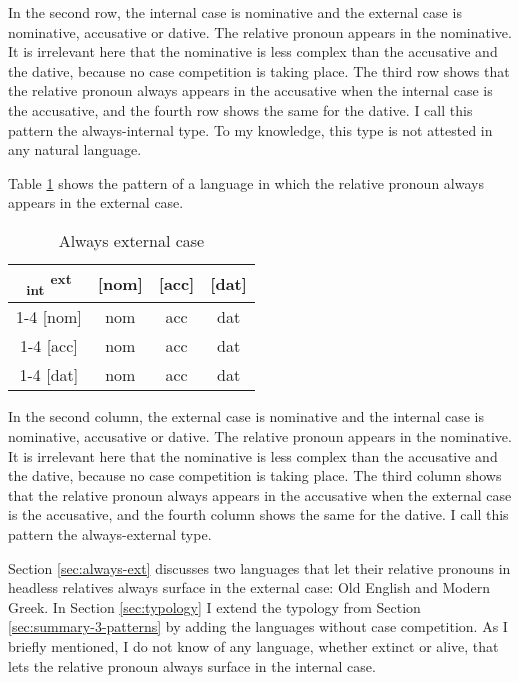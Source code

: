 In the second row, the internal case is nominative and the external case is nominative, accusative or dative. The relative pronoun appears in the nominative. It is irrelevant here that the nominative is less complex than the accusative and the dative, because no case competition is taking place. The third row shows that the relative pronoun always appears in the accusative when the internal case is the accusative, and the fourth row shows the same for the dative. I call this pattern the always-internal type. To my knowledge, this type is not attested in any natural language.

Table \ref{tbl:no-case-competition-ext} shows the pattern of a language in which the relative pronoun always appears in the external case.

\begin{table}[ht]
  \center
  \caption{Always external case}
  \begin{tabular}{c|c|c|c}
    \toprule
   \textsubscript{\ac{int}} \textsuperscript{\ac{ext}}
          & [\ac{nom}]
          & [\ac{acc}]
          & [\ac{dat}]
          \\ \cmidrule{1-4}
      [\ac{nom}]
          & \ac{nom}
          & \ac{acc}
          & \ac{dat}
          \\ \cmidrule{1-4}
      [\ac{acc}]
          & \ac{nom}
          & \ac{acc}
          & \ac{dat}
          \\ \cmidrule{1-4}
      [\ac{dat}]
          & \ac{nom}
          & \ac{acc}
          & \ac{dat}
          \\
    \bottomrule
  \end{tabular}
  \label{tbl:no-case-competition-ext}
\end{table}

In the second column, the external case is nominative and the internal case is nominative, accusative or dative. The relative pronoun appears in the nominative. It is irrelevant here that the nominative is less complex than the accusative and the dative, because no case competition is taking place. The third column shows that the relative pronoun always appears in the accusative when the external case is the accusative, and the fourth column shows the same for the dative. I call this pattern the always-external type.

Section \ref{sec:always-ext} discusses two languages that let their relative pronouns in headless relatives always surface in the external case: Old English and Modern Greek. In Section \ref{sec:typology} I extend the typology from Section \ref{sec:summary-3-patterns} by adding the languages without case competition. As I briefly mentioned, I do not know of any language, whether extinct or alive, that lets the relative pronoun always surface in the internal case.


